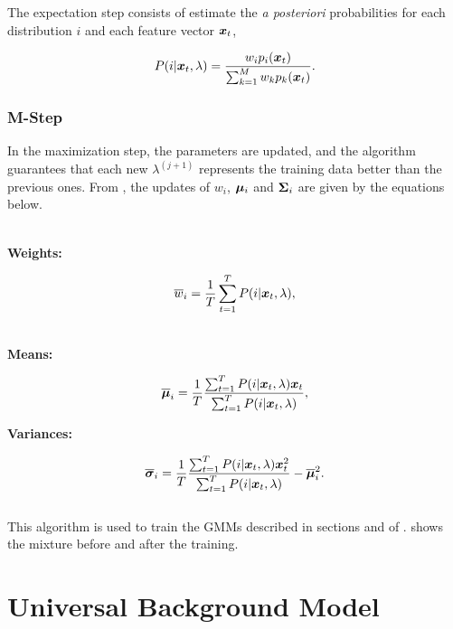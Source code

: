 The expectation step consists of estimate the \emph{a posteriori} probabilities for each distribution $i$ and each feature vector $\boldsymbol{x}_t$,

\begin{equation}
    \postprob{i}{\dvec{x}_t, \lambda} = \frac{w_i p_i(\dvec{x}_t)}{\sum_{k=1}^M w_k p_k(\dvec{x}_t)}.
    \label{eq:e-step-posterior}
\end{equation}

\subsubsection*{M-Step}

In the maximization step, the parameters are updated, and the algorithm guarantees that each new $\lambda^(j+1)$ represents the training data better than the previous ones. From , the updates of $w_i$, $\boldsymbol{\mu}_i$ and $\boldsymbol{\Sigma}_i$ are given by the equations below.

\noindent\\\textbf{Weights:}

\begin{equation}
    \overline{w}_i = \frac{1}{T} \sum_{t=1}^T \postprob{i}{\dvec{x}_t, \lambda},
    \label{eq:m-step-weight}
\end{equation}

\noindent\\\textbf{Means:}

\begin{equation}
    \overline{\dvec{\mu}}_i = \frac{1}{T} \frac{\sum_{t=1}^T \postprob{i}{\dvec{x}_t, \lambda} \dvec{x}_t}{\sum_{t=1}^T \postprob{i}{\dvec{x}_t, \lambda}},
    \label{eq:m-step-means}
\end{equation}

\noindent\textbf{Variances:}

\begin{equation}
    \overline{\dvec{\sigma}}_i = \frac{1}{T} \frac{\sum_{t=1}^T \postprob{i}{\dvec{x}_t, \lambda} \dvec{x}_t^2}{\sum_{t=1}^T \postprob{i}{\dvec{x}_t, \lambda}} - \overline{\dvec{\mu}}_i^2.
    \label{eq:m-step-means}
\end{equation}
\\

This algorithm is used to train the GMMs described in sections  and  of .  shows the mixture before and after the training.

\section{Universal Background Model}